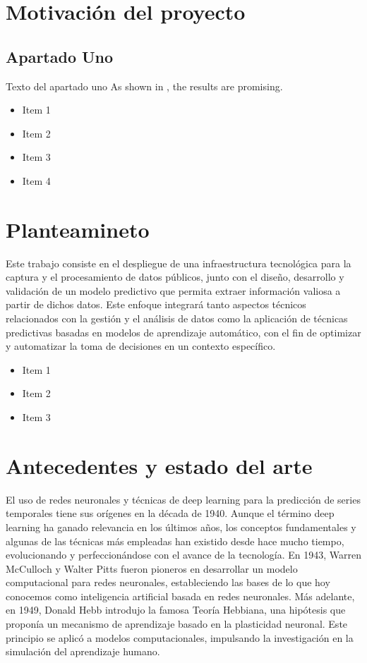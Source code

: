 \section{Motivación del proyecto}
\subsection{Apartado Uno}
\begin{large}
Texto del apartado uno
As shown in \cite{smith2023}, the results are promising.

\begin{itemize}
   \item Item 1
   \item Item 2
   \item Item 3
   \item Item 4
\end{itemize}
\end{large}

\section{Planteamineto}
Este trabajo consiste en el despliegue de una infraestructura tecnológica para la captura y el procesamiento de datos públicos, 
junto con el diseño, desarrollo y validación de un modelo predictivo que permita extraer información valiosa a partir de dichos datos.
Este enfoque integrará tanto aspectos técnicos relacionados con la gestión y el análisis de datos como la aplicación de técnicas predictivas
basadas en modelos de aprendizaje automático, con el fin de optimizar y automatizar la toma de decisiones en un contexto específico.
\begin{large}
\begin{itemize}
   \item Item 1
   \item Item 2
   \item Item 3
\end{itemize}
\end{large}

\section{Antecedentes y estado del arte}

El uso de redes neuronales y técnicas de deep learning para la predicción de series temporales tiene sus orígenes en la década de 1940. Aunque el término deep learning ha ganado relevancia en los últimos años, los conceptos fundamentales y algunas de las técnicas más empleadas han existido desde hace mucho tiempo, evolucionando y perfeccionándose con el avance de la tecnología.
En 1943, Warren McCulloch y Walter Pitts fueron pioneros en desarrollar un modelo computacional para redes neuronales, estableciendo las bases de lo que hoy conocemos como inteligencia artificial basada en redes neuronales. Más adelante, en 1949, Donald Hebb introdujo la famosa Teoría Hebbiana, una hipótesis que proponía un mecanismo de aprendizaje basado en la plasticidad neuronal. Este principio se aplicó a modelos computacionales, impulsando la investigación en la simulación del aprendizaje humano.


